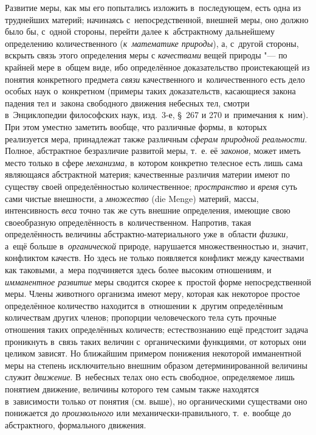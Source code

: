 Развитие меры, как мы его попытались изложить в~последующем, есть одна из
труднейших материй; начинаясь с~непосредственной, внешней меры, оно должно было
бы, с~одной стороны, перейти далее к~абстрактному дальнейшему определению
количественного ({\em к~математике природы}), а, с~другой стороны, вскрыть
связь этого определения меры с {\em качествами} вещей природы "--- по крайней
мере в~общем виде, ибо определённое доказательство проистекающей из понятия
конкретного предмета {\em связи} качественного и~количественного есть дело
особых наук о~конкретном (примеры таких доказательств, касающиеся закона
падения тел и~закона свободного движения небесных тел, смотри в~Энциклопедии
философских наук, изд.~3-е, \S~267 и 270 и~примечания к~ним). При этом уместно
заметить вообще, что различные формы, в~которых реализуется мера, принадлежат
также различным {\em сферам природной реальности}. Полное, абстрактное
безразличие развитой меры, т.~е. её {\em законов,} может иметь место только в
сфере {\em механизма,} в~котором конкретно телесное есть лишь сама являющаяся
абстрактной материя; качественные различия материи имеют по существу своей
определённостью количественное; {\em пространство} и {\em время} суть сами
чистые внешности, а {\em множество} (die Menge) материй, массы, интенсивность
{\em веса} точно так же суть внешние определения, имеющие свою своеобразную
определённость в~количественном. Напротив, такая определённость величины
абстрактно-материального уже в~области {\em физики,} а~ещё больше
в~{\em органической} природе, нарушается множественностью и, значит, конфликтом
качеств. Но здесь не только появляется конфликт между качествами как таковыми,
а~мера подчиняется здесь более высоким отношениям, и {\em имманентное развитие}
меры сводится скорее к~простой форме непосредственной меры. Члены животного
организма имеют меру, которая как некоторое простое определённое количество
находится в~отношении к~другим определённым количествам других членов;
пропорции человеческого тела суть прочные отношения таких определённых
количеств; естествознанию ещё предстоит задача проникнуть в~связь таких величин
с~органическими функциями, от которых они целиком зависят. Но ближайшим
примером понижения некоторой имманентной меры на степень исключительно внешним
образом детерминированной величины служит {\em движение}. В~небесных телах оно
есть свободное, определяемое лишь понятием движение, величины которого тем
самым также находятся в~зависимости только от понятия (см. выше), но
органическими существами оно понижается до {\em произвольного} или
механически-правильного, т.~е. вообще до абстрактного, формального движения.

